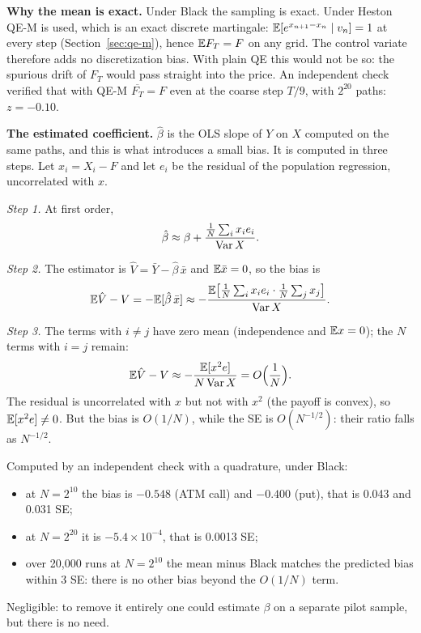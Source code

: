 \textbf{Why the mean is exact.} Under Black the sampling is exact. Under Heston QE-M is used, which is an exact
discrete martingale: $\mathbb{E}[e^{x_{n+1}-x_n}\mid v_n]=1$ at every step (Section~\ref{sec:qe-m}), hence $\mathbb{E} F_T=F$ on any
grid. The control variate therefore adds no discretization bias. With plain QE this would not be so: the spurious
drift of $F_T$ would pass straight into the price. An independent check verified that with QE-M $\overline{F_T}=F$
even at the coarse step $T/9$, with $2^{20}$ paths: $z=-0.10$.

\textbf{The estimated coefficient.} $\hat\beta$ is the OLS slope of $Y$ on $X$ computed on the same paths, and this is
what introduces a small bias. It is computed in three steps. Let $x_i=X_i-F$ and let $e_i$ be the residual of the
population regression, uncorrelated with $x$.

\textit{Step 1.} At first order,
\[
\hat\beta\approx\beta+\frac{\frac1N\sum_ix_ie_i}{\operatorname{Var} X}.
\]

\textit{Step 2.} The estimator is $\hat V=\bar Y-\hat\beta\,\bar x$ and $\mathbb{E}\bar x=0$, so the bias is
\[
\mathbb{E}\hat V-V=-\mathbb{E}[\hat\beta\,\bar x]\approx-\frac{\mathbb{E}\big[\frac1N\sum_ix_ie_i\cdot\frac1N\sum_jx_j\big]}{\operatorname{Var} X}.
\]

\textit{Step 3.} The terms with $i\ne j$ have zero mean (independence and $\mathbb{E} x=0$); the $N$ terms with $i=j$ remain:
\begin{equation}\label{eq:bm-cv-bias}
\mathbb{E}\hat V-V\approx-\frac{\mathbb{E}[x^2e]}{N\operatorname{Var} X}=O\Big(\frac1N\Big).
\end{equation}
The residual is uncorrelated with $x$ but not with $x^2$ (the payoff is convex), so $\mathbb{E}[x^2e]\ne0$. But the bias is
$O(1/N)$, while the SE is $O(N^{-1/2})$: their ratio falls as $N^{-1/2}$.

\begin{progetto}[title={In the qpricer project: the bias of the estimated coefficient}]
Computed by an independent check with a quadrature, under Black:
\begin{itemize}
\item at $N=2^{10}$ the bias is $-0.548$ (ATM call) and $-0.400$ (put), that is 0.043 and 0.031 SE;
\item at $N=2^{20}$ it is $-5.4\times10^{-4}$, that is 0.0013 SE;
\item over 20{,}000 runs at $N=2^{10}$ the mean minus Black matches the predicted bias within 3 SE: there is no other
bias beyond the $O(1/N)$ term.
\end{itemize}
Negligible: to remove it entirely one could estimate $\beta$ on a separate pilot sample, but there is no need.
\end{progetto}

